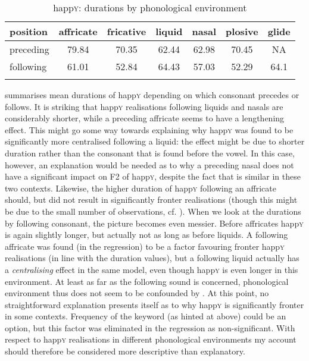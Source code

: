 \begin{table}
	
	\caption{happ\textsc{y}: durations by phonological environment}
	\label{tab.dur.phon.happy}
	\begin{tabular}{lcccccc}
		\lsptoprule
		position & affricate & fricative & liquid & nasal & plosive & glide\\
		\midrule
		preceding & 79.84 & 70.35 & 62.44 & 62.98 & 70.45 & NA\\
		following & 61.01 & 52.84 & 64.43 & 57.03 & 52.29 & 64.1\\
		\lspbottomrule
	\end{tabular}
\end{table}

 summarises mean durations of happ\textsc{y} depending on which consonant precedes or follows.
It is striking that happ\textsc{y} realisations following liquids and nasals are considerably shorter, while a preceding affricate seems to have a lengthening effect.
This might go some way towards explaining why happ\textsc{y} was found to be significantly more centralised following a liquid: the effect might be due to shorter duration rather than the consonant that is found before the vowel.
In this case, however, an explanation would be needed as to why a preceding nasal does not have a significant impact on F2 of happ\textsc{y}, despite the fact that  is similar in these two contexts.
Likewise, the higher duration of happ\textsc{y} following an affricate should, but did not result in significantly fronter realisations (though this might be due to the small number of observations, cf. ).
When we look at the durations by following consonant, the picture becomes even messier.
Before affricates happ\textsc{y} is again slightly longer, but actually not as long as before liquids.
A following affricate was found (in the regression) to be a factor favouring fronter happ\textsc{y} realisations (in line with the duration values), but a following liquid actually has a \emph{centralising} effect in the same model, even though happ\textsc{y} is even longer in this environment.
At least as far as the following sound is concerned, phonological environment thus does not seem to be confounded by .
At this point, no straightforward explanation presents itself as to why happ\textsc{y} is significantly fronter in some contexts.
Frequency of the keyword (as hinted at above) could be an option, but this factor was eliminated in the regression as non-significant.
With respect to happ\textsc{y} realisations in different phonological environments my account should therefore be considered more descriptive than explanatory.

